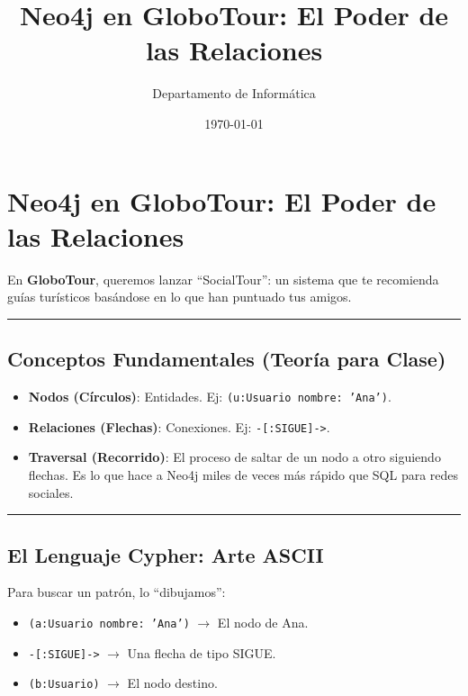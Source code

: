 \documentclass[12pt,a4paper]{article}
\title{\textbf{Neo4j en GloboTour: El Poder de las Relaciones}}
\author{Departamento de Informática}
\date{\today}
\begin{document}
\maketitle

\section{Neo4j en GloboTour: El Poder de las Relaciones}\label{neo4j-en-globotour-el-poder-de-las-relaciones}

En \textbf{GloboTour}, queremos lanzar \enquote{SocialTour}: un sistema que te recomienda guías turísticos basándose en lo que han puntuado tus amigos.

\begin{center}\rule{0.5\linewidth}{0.5pt}\end{center}

\subsection{Conceptos Fundamentales (Teoría para Clase)}\label{conceptos-fundamentales-teoruxeda-para-clase}

\begin{itemize}
    \item \textbf{Nodos (Círculos)}: Entidades. Ej: \texttt{(u:Usuario {nombre: 'Ana'})}.
    \item \textbf{Relaciones (Flechas)}: Conexiones. Ej: \texttt{-[:SIGUE]->}.
    \item \textbf{Traversal (Recorrido)}: El proceso de saltar de un nodo a otro siguiendo flechas. Es lo que hace a Neo4j miles de veces más rápido que SQL para redes sociales.
\end{itemize}

\begin{center}\rule{0.5\linewidth}{0.5pt}\end{center}

\subsection{El Lenguaje Cypher: Arte ASCII}\label{el-lenguaje-cypher-arte-ascii}

Para buscar un patrón, lo \enquote{dibujamos}:
\begin{itemize}
    \item \texttt{(a:Usuario {nombre: 'Ana'})} $\rightarrow$ El nodo de Ana.
    \item \texttt{-[:SIGUE]->} $\rightarrow$ Una flecha de tipo SIGUE.
    \item \texttt{(b:Usuario)} $\rightarrow$ El nodo destino.
\end{itemize}
\end{document}
